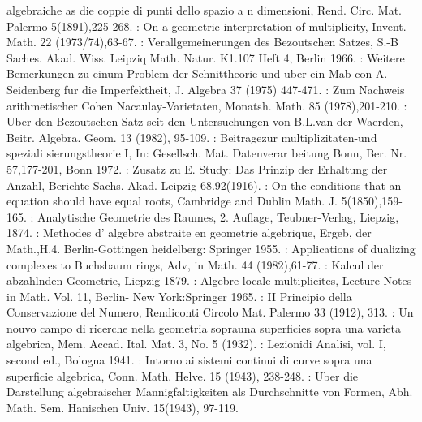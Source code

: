 \begin{thebibliography}{99}
  algebraiche as die coppie di punti dello spazio a n dimensioni,
  Rend. Circ. Mat. Palermo 5(1891),225-268. 
:  On a geometric interpretation of
  multiplicity, Invent. Math. 22 (1973/74),63-67. 
:   Verallgemeinerungen des Bezoutschen
  Satzes, S.-B Saches. Akad. Wiss. Leipziq Math. Natur. K1.107 Heft
  4, Berlin 1966. 
:  Weitere
  Bemerkungen zu einum Problem der Schnittheorie und uber ein Mab con
  A. Seidenberg fur die Imperfektheit, J. Algebra 37 (1975)
  447-471. 
:   Zum Nachweis
  arithmetischer Cohen Nacaulay-Varietaten, Monatsh. Math. 85
  (1978),201-210. 
:  Uber den Bezoutschen Satz
  seit den Untersuchungen von B.L.van der Waerden,
  Beitr. Algebra. Geom. 13 (1982), 95-109. 
:  Beitrage\pageoriginale zur multiplizitaten-und speziali
  sierungstheorie I, In: Gesellsch. Mat. Datenverar beitung Bonn,
  Ber. Nr. 57,177-201, Bonn 1972. 
:  Zusatz zu E. Study: Das Prinzip der
  Erhaltung der Anzahl, Berichte Sachs. Akad. Leipzig 68.92(1916). 
:  On the conditions that an equation should
  have equal roots, Cambridge and Dublin Math. J. 5(1850),159-165. 
:  Analytische Geometrie des
  Raumes, 2. Auflage, Teubner-Verlag, Liepzig, 1874. 
:   Methodes d' algebre abstraite en
  geometrie algebrique, Ergeb, der Math.,H.4. Berlin-Gottingen
  heidelberg: Springer 1955. 
:  Applications of dualizing complexes to
  Buchsbaum rings, Adv, in Math. 44 (1982),61-77. 
:   Kalcul der abzahlnden Geometrie, Liepzig 1879.
:  Algebre locale-multiplicites, Lecture
  Notes in Math. Vol. 11, Berlin- New York:Springer 1965. 
:   II Principio della Conservazione del
  Numero, Rendiconti Circolo Mat. Palermo 33 (1912), 313. 
:   Un nouvo campo di ricerche nella
  geometria soprauna superficies sopra una varieta algebrica,
  Mem. Accad. Ital. Mat. 3, No. 5 (1932). 
:   Lezioni\pageoriginale di Analisi, vol. I, second ed.,
  Bologna 1941. 
:   Intorno ai sistemi continui di curve
  sopra una superficie algebrica, Conn. Math. Helve. 15 (1943),
  238-248. 
:   Uber die Darstellung algebraischer
  Mannigfaltigkeiten als Durchschnitte von Formen,
  Abh. Math. Sem. Hanischen Univ. 15(1943), 97-119. 

\end{thebibliography}
